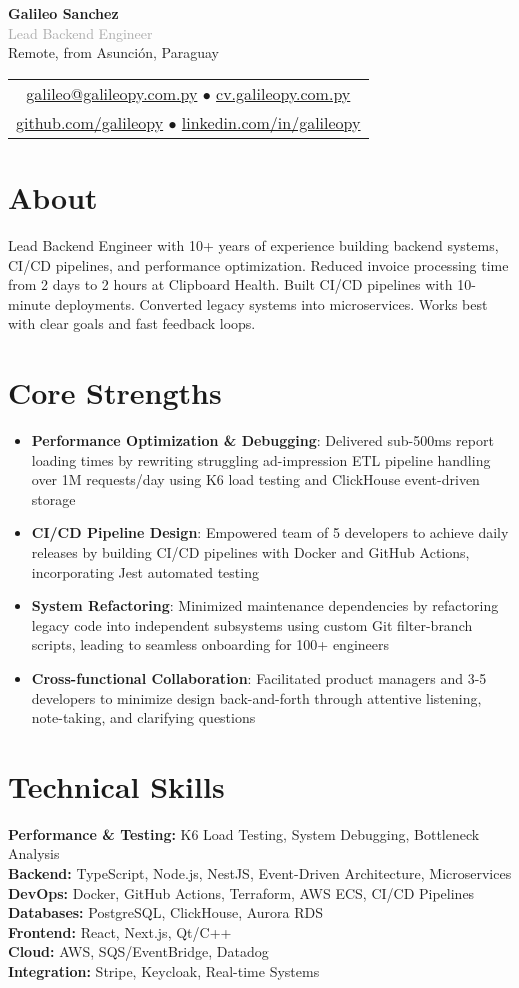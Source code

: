 \documentclass[11pt,a4paper]{article}
\newcommand{\cvheader}[5]{
  \begin{center}
    {\Huge \textbf{#1}}\\[0.4em]
    {\Large \textcolor{darkgray}{#2}}\\[1em]
    
    \textcolor{mediumgray}{#3}\\[0.6em]
    
    \begin{tabular}{c}
      \href{mailto:#4}{#4} $\bullet$ \href{https://#5}{#5}\\[0.3em]
      \href{https://github.com/galileopy}{github.com/galileopy} $\bullet$ 
      \href{https://www.linkedin.com/in/galileopy}{linkedin.com/in/galileopy}
    \end{tabular}
  \end{center}
  \vspace{1.2em}
}
\begin{document}
\cvheader{Galileo Sanchez}{Lead Backend Engineer}{Remote, from Asunción, Paraguay}{galileo@galileopy.com.py}{cv.galileopy.com.py}

\section{About}
Lead Backend Engineer with 10+ years of experience building backend systems, CI/CD pipelines, and performance optimization. Reduced invoice processing time from 2 days to 2 hours at Clipboard Health. Built CI/CD pipelines with 10-minute deployments. Converted legacy systems into microservices. Works best with clear goals and fast feedback loops.

\section{Core Strengths}

\begin{itemize}
	\item \textbf{Performance Optimization \& Debugging}: Delivered sub-500ms report loading times by rewriting struggling ad-impression ETL pipeline handling over 1M requests/day using K6 load testing and ClickHouse event-driven storage
	\item \textbf{CI/CD Pipeline Design}: Empowered team of 5 developers to achieve daily releases by building CI/CD pipelines with Docker and GitHub Actions, incorporating Jest automated testing
	\item \textbf{System Refactoring}: Minimized maintenance dependencies by refactoring legacy code into independent subsystems using custom Git filter-branch scripts, leading to seamless onboarding for 100+ engineers
	\item \textbf{Cross-functional Collaboration}: Facilitated product managers and 3-5 developers to minimize design back-and-forth through attentive listening, note-taking, and clarifying questions
\end{itemize}

\section{Technical Skills}

\textbf{Performance \& Testing:} K6 Load Testing, System Debugging, Bottleneck Analysis\\[0.4em]
\textbf{Backend:} TypeScript, Node.js, NestJS, Event-Driven Architecture, Microservices\\[0.4em]
\textbf{DevOps:} Docker, GitHub Actions, Terraform, AWS ECS, CI/CD Pipelines\\[0.4em]
\textbf{Databases:} PostgreSQL, ClickHouse, Aurora RDS\\[0.4em]
\textbf{Frontend:} React, Next.js, Qt/C++\\[0.4em]
\textbf{Cloud:} AWS, SQS/EventBridge, Datadog\\[0.4em]
\textbf{Integration:} Stripe, Keycloak, Real-time Systems
\end{document}
